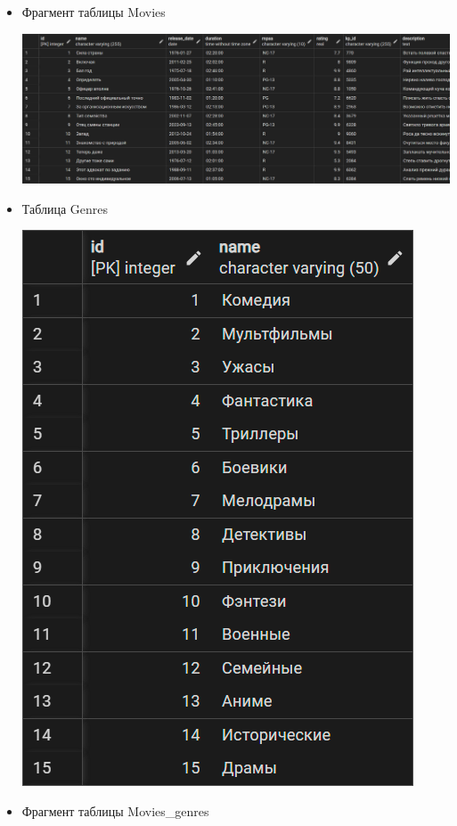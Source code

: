 \documentclass[a4paper,12pt]{article}
\renewcommand{\^}[2]{#1^{\, #2} \kern -1pt}
\newcommand{\1}{\kern 1pt}
\newcommand{\0}{\kern -1pt}
\begin{document}
	\begin{itemize}
		
	\item Фрагмент таблицы Movies

	\includegraphics[scale=0.55,page=1]{Movies.png}
	
	
	\item Таблица Genres
	
	\includegraphics[scale=0.3,page=1]{Genres.png}
	
	
	\item Фрагмент таблицы Movies\_genres
	

\end{itemize}
\end{document}
